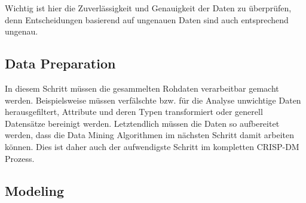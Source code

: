 Wichtig ist hier die Zuverlässigkeit und Genauigkeit der Daten zu überprüfen,
denn Entscheidungen basierend auf ungenauen Daten sind auch entsprechend ungenau.

\subsection{Data Preparation}
\label{sec:process:crispdm:dp}

In diesem Schritt müssen die gesammelten Rohdaten verarbeitbar gemacht werden.
Beispielsweise müssen verfälschte bzw. für die Analyse unwichtige Daten
herausgefiltert, Attribute und deren Typen transformiert oder generell
Datensätze bereinigt werden. Letztendlich müssen die Daten so aufbereitet
werden, dass die Data Mining Algorithmen im nächsten Schritt damit arbeiten
können. Dies ist daher auch der aufwendigste Schritt im kompletten CRISP-DM
Prozess.

\subsection{Modeling}
\label{sec:process:crispdm:mod}

